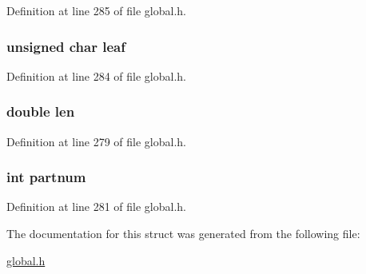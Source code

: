 Definition at line 285 of file global.\-h.

\hypertarget{structbht__node_afdde1540721b0d5dbc4b234677b4ad8d}{
\subsubsection[{leaf}]{\setlength{\rightskip}{0pt plus 5cm}unsigned char leaf}}\label{structbht__node_afdde1540721b0d5dbc4b234677b4ad8d}


Definition at line 284 of file global.\-h.

\hypertarget{structbht__node_ad4bd51cdbe6ba41894905207ed94974f}{
\subsubsection[{len}]{\setlength{\rightskip}{0pt plus 5cm}double len}}\label{structbht__node_ad4bd51cdbe6ba41894905207ed94974f}


Definition at line 279 of file global.\-h.

\hypertarget{structbht__node_a0c60ab00baa47c069768352b2f2b6d3d}{
\subsubsection[{partnum}]{\setlength{\rightskip}{0pt plus 5cm}int partnum}}\label{structbht__node_a0c60ab00baa47c069768352b2f2b6d3d}


Definition at line 281 of file global.\-h.



The documentation for this struct was generated from the following file\-:\begin{DoxyCompactItemize}
\item 
\hyperlink{global_8h}{global.\-h}\end{DoxyCompactItemize}

